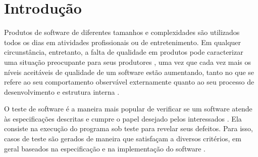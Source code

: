 \documentclass[
	12pt,				%
	oneside,			%
	a4paper,			%
	english,			%
	brazil				%
	]{abntex2ppgsi}
\begin{document}

%
% 


\tableofcontents*
\cleardoublepage



\textual



% 
%
%
\chapter{Introdução}
Produtos de software de diferentes tamanhos e complexidades são utilizados todos os dias em atividades profissionais ou de entretenimento. Em qualquer circunstância, entretanto, a falta de qualidade em produtos pode caracterizar uma situação preocupante para seus produtores \cite{hilburn2002software}  \cite{binder1994test}, uma vez que cada vez mais os níveis aceitáveis de qualidade de um software estão aumentando, tanto no que se refere ao seu comportamento observável externamente quanto ao seu processo de desenvolvimento e estrutura interna \cite{linda2006quality} \cite{bashir2008test} \cite{graham2008foundations}.


O teste de software \cite{tahir2014test} é a maneira mais popular de verificar se um software atende às especificações descritas e cumpre o papel desejado pelos interessados \cite{sommerville2008engenharia}. Ela consiste na execução do programa sob teste para revelar seus defeitos. Para isso, casos de teste são gerados de maneira que satisfaçam a diversos critérios, em geral baseados na especificação e na implementação do software \cite{pezze2008software}. 
\end{document}
